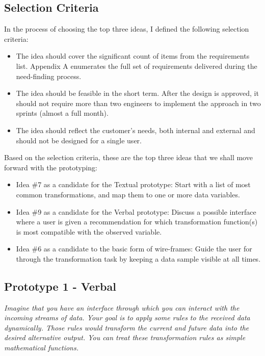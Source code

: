 \documentclass[12pt,letterpaper]{article}
\begin{document}
\subsection*{Selection Criteria}
In the process of choosing the top three ideas, I defined the following selection criteria:

\begin{itemize}
    \item The idea should cover the significant count of items from the requirements list. Appendix A enumerates the full set of requirements delivered during the need-finding process.
    \item The idea should be feasible in the short term. After the design is approved, it should not require more than two engineers to implement the approach in two sprints (almost a full month).
    \item The idea should reflect the customer's needs, both internal and external and should not be designed for a single user. 
\end{itemize}

Based on the selection criteria, these are the top three ideas that we shall move forward with the prototyping:

\begin{itemize}
    \item Idea \#7 as a candidate for the Textual prototype: Start with a list of most common transformations, and map them to one or more data variables.
    \item Idea \#9 as a candidate for the Verbal prototype: Discuss a possible interface where a user is given a recommendation for which transformation function(s) is most compatible with the observed variable.
    \item Idea \#6 as a candidate to the basic form of wire-frames: Guide the user for through the transformation task by keeping a data sample visible at all times.  
\end{itemize}


\subsection*{Prototype 1 - Verbal}

\textit{Imagine that you have an interface through which you can interact with the incoming streams of data. Your goal is to apply some rules to the received data dynamically. Those rules would transform the current and future data into the desired alternative output. You can treat these transformation rules as simple mathematical functions.}
\end{document}

